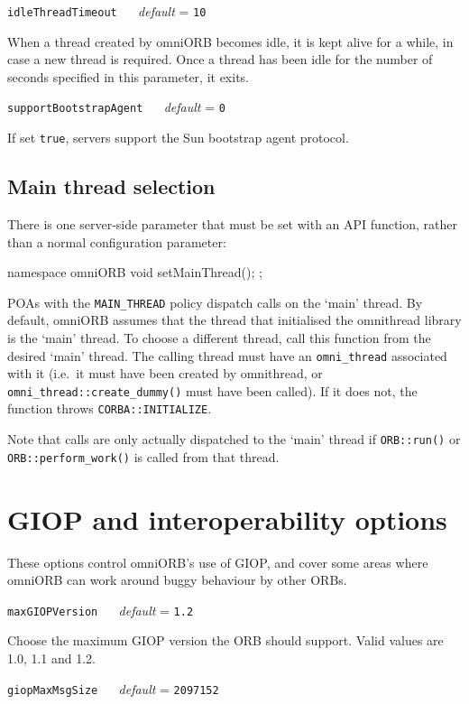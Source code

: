 \documentclass[11pt,twoside,a4paper]{book}
\makeatletter
\newcommand{\code}[1]{\texttt{#1}}
\newcommand{\op}[1]{\texttt{#1()}}
\newcommand{\confopt}[2]
  {\vspace{\baselineskip}\par\noindent\code{#1} ~~ \textit{default} =
   \code{#2}}
\renewcommand{\confopt}[2]
  {\vspace{\baselineskip}\par\noindent\code{#1} ~~ \textit{default} =
   \code{#2}\\[-1ex]\@afterheading}
\newcommand{\dsc}{\discretionary{}{}{}}
\makeatother
\begin{document}
\confopt{idleThreadTimeout}{10}

When a thread created by omniORB becomes idle, it is kept alive for a
while, in case a new thread is required. Once a thread has been idle
for the number of seconds specified in this parameter, it exits.

\confopt{supportBootstrapAgent}{0}

If set \code{true}, servers support the Sun bootstrap agent protocol.


\subsection{Main thread selection}

There is one server-side parameter that must be set with an API
function, rather than a normal configuration parameter:

\begin{cxxlisting}
namespace omniORB {
  void setMainThread();
};
\end{cxxlisting}

\noindent
POAs with the \code{MAIN\_THREAD} policy dispatch calls on the `main'
thread.  By default, omniORB assumes that the thread that initialised
the omnithread library is the `main' thread. To choose a different
thread, call this function from the desired `main' thread. The calling
thread must have an \code{omni\_thread} associated with it (i.e.\ it
must have been created by omnithread, or
\op{omni\_thread::create\_\dsc{}dummy} must have been called). If it
does not, the function throws \code{CORBA::\dsc{}INITIALIZE}.
                                                                  
Note that calls are only actually dispatched to the `main' thread if
\op{ORB::run} or \op{ORB::perform\_work} is called from that thread.




\section{GIOP and interoperability options}

These options control omniORB's use of GIOP, and cover some areas
where omniORB can work around buggy behaviour by other ORBs.


\confopt{maxGIOPVersion}{1.2}

Choose the maximum GIOP version the ORB should support. Valid values
are 1.0, 1.1 and 1.2.


\confopt{giopMaxMsgSize}{2097152}
\end{document}
